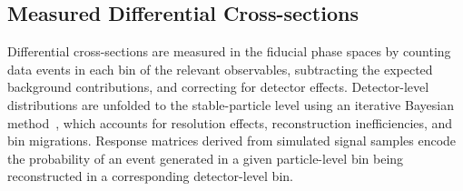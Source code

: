 \subsection{Measured Differential Cross-sections}
\label{subsec:diff-xs}

Differential cross-sections are measured in the fiducial phase spaces by counting data events in each bin of the relevant observables, subtracting the expected background contributions, and correcting for detector effects. Detector-level distributions are unfolded to the stable-particle level using an iterative Bayesian method~\cite{DAgostini:1995}, which accounts for resolution effects, reconstruction inefficiencies, and bin migrations. Response matrices derived from simulated signal samples encode the probability of an event generated in a given particle-level bin being reconstructed in a corresponding detector-level bin. 

